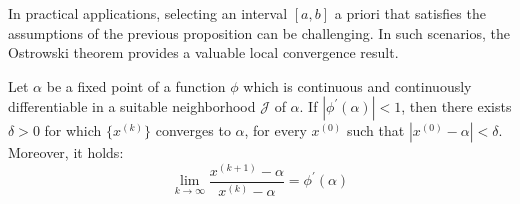 In practical applications, selecting an interval $[a,b]$ a priori that satisfies the assumptions of the previous proposition can be challenging.
In such scenarios, the Ostrowski theorem provides a valuable local convergence result.
\begin{theorem}
    Let $\alpha$ be a fixed point of a function $\phi$ which is continuous and continuously differentiable in a suitable neighborhood $\mathcal{J}$ of $\alpha$. 
    If $\left\lvert \phi^{'}(\alpha) \right\rvert < 1$, then there exists $\delta > 0$ for which $\{x^{(k)}\}$ converges to $\alpha$, for every $x^{(0)}$ such that $\left\lvert x^{(0)}-\alpha \right\rvert < \delta$. 
    Moreover, it holds: 
    \[\lim_{k \rightarrow \infty}\dfrac{x^{(k+1)}-\alpha}{x^{(k)}-\alpha}=\phi^{'}(\alpha)\]
\end{theorem}

